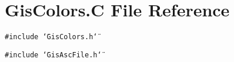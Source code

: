 \hypertarget{GisColors_8C}{
\section{Gis\-Colors.C File Reference}
\label{GisColors_8C}
}
{\tt \#include \char`\"{}Gis\-Colors.h\char`\"{}}\par
{\tt \#include \char`\"{}Gis\-Asc\-File.h\char`\"{}}\par
